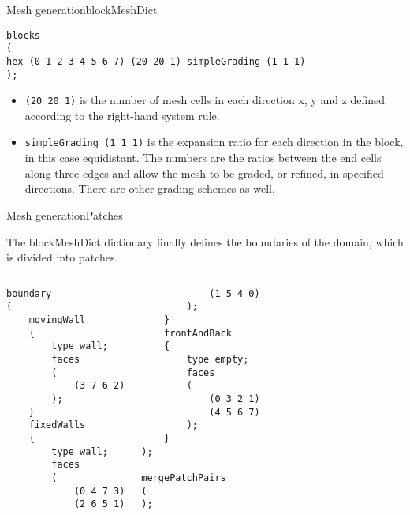 \documentclass{beamer}
\begin{document}
\begin{frame}[fragile]{Mesh generation}{blockMeshDict}
\begin{verbatim}
blocks
(
hex (0 1 2 3 4 5 6 7) (20 20 1) simpleGrading (1 1 1)
);
\end{verbatim}

\begin{itemize}
\item \texttt{(20 20 1)} is the number of mesh cells in each direction x, y and z defined according to the right-hand system rule.
\item \texttt{simpleGrading (1 1 1)} is the expansion ratio for each direction in the block, in this case equidistant. The numbers are the ratios between the end cells along three edges and allow the mesh to be graded, or refined, in specified directions. There are other grading schemes as well.
\end{itemize}


\end{frame}

\begin{frame}[fragile]{Mesh generation}{Patches}

The blockMeshDict dictionary finally defines the boundaries of the domain, which is divided into patches.\\[0.2cm]
\vspace{-0.1cm}
\begin{columns}[c]
\column{5.5cm} 

\begin{lrbox}{\mybox}
  \begin{minipage}{12em}
\begin{scriptsize}
\begin{verbatim}
boundary
(
    movingWall
    {
        type wall;
        faces
        (
            (3 7 6 2)
        );
    }
    fixedWalls
    {
        type wall;
        faces
        (
            (0 4 7 3)
            (2 6 5 1)
\end{verbatim}
\end{scriptsize}
\end{minipage}
\end{lrbox}

\fbox{\usebox\mybox}


\column{5.5cm} 

\begin{lrbox}{\mybox}
  \begin{minipage}{12em}
\begin{scriptsize}
\begin{verbatim}
            (1 5 4 0)
        );
    }
    frontAndBack
    {
        type empty;
        faces
        (
            (0 3 2 1)
            (4 5 6 7)
        );
    }
);

mergePatchPairs
(
);
\end{verbatim}
\end{scriptsize}
\end{minipage}
\end{lrbox}

\fbox{\usebox\mybox}

\end{columns}


\end{frame}
\end{document}
